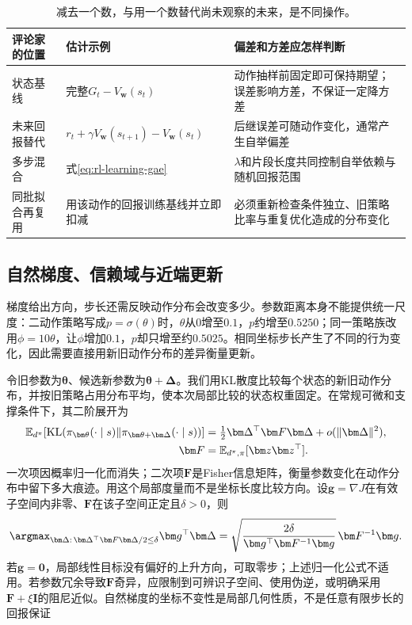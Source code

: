\begin{table}[t]
  \centering
  \small
  \begin{tabularx}{\linewidth}{>{\raggedright\arraybackslash}p{30mm} >{\raggedright\arraybackslash}X >{\raggedright\arraybackslash}X}
    \toprule
    评论家的位置 & 估计示例 & 偏差和方差应怎样判断 \\
    \midrule
    状态基线 & 完整$G_t-V_{\bm w}(s_t)$ & 动作抽样前固定即可保持期望；误差影响方差，不保证一定降方差 \\
    未来回报替代 & $r_t+\gamma V_{\bm w}(s_{t+1})-V_{\bm w}(s_t)$ & 后继误差可随动作变化，通常产生自举偏差 \\
    多步混合 & 式\eqref{eq:rl-learning-gae} & $\lambda$和片段长度共同控制自举依赖与随机回报范围 \\
    同批拟合再复用 & 用该动作的回报训练基线并立即扣减 & 必须重新检查条件独立、旧策略比率与重复优化造成的分布变化 \\
    \bottomrule
  \end{tabularx}
  \caption{减去一个数，与用一个数替代尚未观察的未来，是不同操作。}
  \label{tab:rl-learning-baseline-bootstrap}
\end{table}

\subsection{自然梯度、信赖域与近端更新}
\label{sec:rl-learning-trust-region}

梯度给出方向，步长还需反映动作分布会改变多少。参数距离本身不能提供统一尺度：二动作策略写成$p=\sigma(\theta)$时，$\theta$从0增至$0.1$，$p$约增至$0.5250$；同一策略族改用$\phi=10\theta$，让$\phi$增加$0.1$，$p$却只增至约$0.5025$。相同坐标步长产生了不同的行为变化，因此需要直接用新旧动作分布的差异衡量更新。

令旧参数为$\bm\theta$、候选新参数为$\bm\theta+\bm\Delta$。我们用KL散度比较每个状态的新旧动作分布，并按旧策略占用分布平均，使本次局部比较的状态权重固定。在常规可微和支撑条件下，其二阶展开为
\begin{align}
  \mathbb E_{d^\pi}\!
    \left[\operatorname{KL}
       (\pi_{\bm\theta}(\cdot\mid s)
           \Vert\pi_{\bm\theta+\bm\Delta}(\cdot\mid s))\right]
    &=\tfrac12\bm\Delta^\top\bm F\bm\Delta
         +o(\lVert\bm\Delta\rVert^2), \notag\\
  \bm F&=\mathbb E_{d^\pi,\pi}[\bm z\bm z^\top].
  \label{eq:rl-learning-fisher}
\end{align}
一次项因概率归一化而消失；二次项$\bm F$是Fisher信息矩阵，衡量参数变化在动作分布中留下多大痕迹。用这个局部度量而不是坐标长度比较方向。设$\bm g=\nabla J$在有效子空间内非零、$\bm F$在该子空间正定且$\delta>0$，则
\[
  \argmax_{\bm\Delta:\,\bm\Delta^\top\bm F\bm\Delta/2\leq\delta}
       \bm g^\top\bm\Delta
     =
     \sqrt{\frac{2\delta}{\bm g^\top\bm F^{-1}\bm g}}\,
       \bm F^{-1}\bm g.
\]
若$\bm g=\bm0$，局部线性目标没有偏好的上升方向，可取零步；上述归一化公式不适用。若参数冗余导致$\bm F$奇异，应限制到可辨识子空间、使用伪逆，或明确采用$\bm F+\xi\bm I$的阻尼近似。自然梯度的坐标不变性是局部几何性质，不是任意有限步长的回报保证


